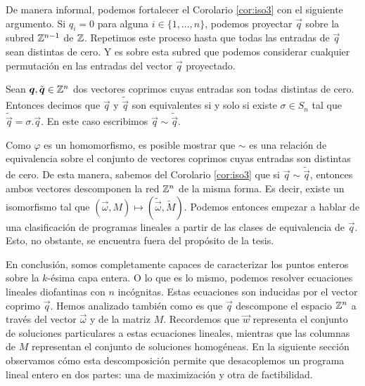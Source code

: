 De manera informal, podemos fortalecer el Corolario \ref{cor:iso3} con el siguiente argumento. Si
$q_i = 0$ para alguna $i \in \lbrace 1, \ldots, n \rbrace$, podemos proyectar $\vec{q}$ sobre
la subred $\mathbb{Z}^{n-1}$ de $\mathbb{Z}$. Repetimos este proceso hasta que todas las entradas de $\vec{q}$ sean
distintas de cero. Y es sobre esta subred que podemos considerar cualquier permutación en las
entradas del vector $\vec{q}$ proyectado.
\begin{definition}
	Sean $\boldsymbol{q}, \tilde{\boldsymbol{q}} \in \mathbb{Z}^n$ dos vectores coprimos cuyas entradas son todas
	distintas de cero. Entonces decimos que $\vec{q}$ y $\tilde{\vec{q}}$ son equivalentes si y solo
	si existe $\sigma \in S_n$ tal que $\tilde{\vec{q}} = \sigma.\vec{q}$. En este caso escribimos
	$\vec{q} \sim \tilde{\vec{q}}$.
\end{definition}
Como $\varphi$ es un homomorfismo, es posible mostrar que $\sim$ es una relación de equivalencia
sobre el conjunto de vectores coprimos cuyas entradas son distintas de cero. De esta manera, sabemos
del Corolario \ref{cor:iso3} que si $\vec{q} \sim \tilde{\vec{q}}$, entonces ambos vectores
descomponen la red $\mathbb{Z}^n$ de la misma forma. Es decir, existe un isomorfismo tal que $(\vec{\omega},
M) \mapsto (\tilde{\vec{\omega}}, \tilde{M})$. Podemos entonces empezar a hablar de una
clasificación de programas lineales a partir de las clases de equivalencia de $\vec{q}$. Esto, no
obstante, se encuentra fuera del propósito de la tesis.

En conclusión, somos completamente capaces de caracterizar los puntos enteros sobre la $k$-ésima
capa entera. O lo que es lo mismo, podemos resolver ecuaciones lineales diofantinas con $n$
incógnitas. Estas ecuaciones son inducidas por el vector coprimo $\vec{q}$. Hemos analizado también
como es que $\vec{q}$ descompone el espacio $\mathbb{Z}^n$ a través del vector $\vec{\omega}$ y de la matriz
$M$. Recordemos que $\vec{w}$ representa el conjunto de soluciones particulares a estas ecuaciones
lineales, mientras que las columnas de $M$ representan el conjunto de soluciones homogéneas. En la
siguiente sección observamos cómo esta descomposición permite que desacoplemos un programa lineal
entero en dos partes: una de maximización y otra de factibilidad.

